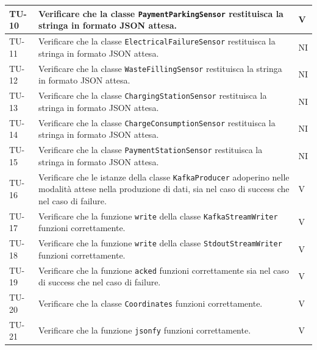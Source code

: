 \documentclass[8pt]{article}
\begin{document}
\begin{longtable}{|>{\centering}p{2cm}|>{\RaggedRight}m{12cm}|>{\centering\arraybackslash}p{2cm}|}
    TU-10 & Verificare che la classe \verb|PaymentParkingSensor| restituisca la stringa in formato JSON attesa. & V \\
    \hline

    TU-11 & Verificare che la classe \verb|ElectricalFailureSensor| restituisca la stringa in formato JSON attesa. & NI \\
    \hline
    
    TU-12 & Verificare che la classe \verb|WasteFillingSensor| restituisca la stringa in formato JSON attesa. & NI \\
    \hline

    TU-13 & Verificare che la classe \verb|ChargingStationSensor| restituisca la stringa in formato JSON attesa. & NI \\
    \hline

    TU-14 & Verificare che la classe \verb|ChargeConsumptionSensor| restituisca la stringa in formato JSON attesa. & NI \\
    \hline

    TU-15 & Verificare che la classe \verb|PaymentStationSensor| restituisca la stringa in formato JSON attesa. & NI \\
    \hline
    
    TU-16 & Verificare che le istanze della classe \verb|KafkaProducer| adoperino nelle modalità attese nella produzione di dati, sia nel caso di success che nel caso di failure. & V \\
    \hline

    TU-17 & Verificare che la funzione \verb|write| della classe \verb|KafkaStreamWriter| funzioni correttamente. & V \\
    \hline

    TU-18 & Verificare che la funzione \verb|write| della classe
    \verb|StdoutStreamWriter| funzioni correttamente. & V \\
    \hline

    TU-19 & Verificare che la funzione \verb|acked| funzioni correttamente sia nel caso di success che nel caso di failure. & V \\
    \hline

    TU-20 & Verificare che la classe \verb|Coordinates| funzioni correttamente. & V \\
    \hline

    TU-21 & Verificare che la funzione \verb|jsonfy| funzioni correttamente. & V \\
    \hline

\end{longtable}
\clearpage
\end{document}
